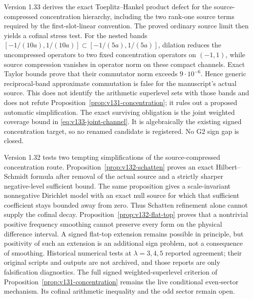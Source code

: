 \documentclass[11pt]{article}
\theoremstyle{remark}
\begin{document}
Version 1.33 derives the exact Toeplitz--Hankel product defect for the
source-compressed concentration hierarchy, including the two rank-one
source terms required by the first-slot-linear convention.  The proved
ordinary source limit then yields a cofinal stress test.  For the nested
bands $[-1/(10a),1/(10a)]\subset[-1/(5a),1/(5a)]$, dilation reduces the
uncompressed operators to two fixed concentration operators on
$(-1,1)$, while source compression vanishes in operator norm on these
compact channels.  Exact Taylor bounds prove that their commutator norm
exceeds $9\cdot10^{-6}$.  Hence generic reciprocal-band approximate
commutation is false for the manuscript's actual source.  This does not
identify the arithmetic superlevel sets with those bands and does not
refute Proposition~\ref{prop:v131-concentration}; it rules out a proposed
automatic simplification.  The exact surviving obligation is the joint
weighted coverage bound in \eqref{eq:v133-joint-channel}.  It is
algebraically the existing signed concentration target, so no renamed
candidate is registered.  No G2 sign gap is closed.

Version 1.32 tests two tempting simplifications of the source-compressed
concentration route.  Proposition~\ref{prop:v132-schatten} proves an
exact Hilbert--Schmidt formula after removal of the actual source and a
strictly sharper negative-level sufficient bound.  The same proposition
gives a scale-invariant nonnegative Dirichlet model with an exact null
source for which that sufficient coefficient stays bounded away from
zero.  Thus Schatten refinement alone cannot supply the cofinal decay.
Proposition~\ref{prop:v132-flat-top} proves that a nontrivial positive
frequency smoothing cannot preserve every form on the physical
difference interval.  A signed flat-top extension remains possible in
principle, but positivity of such an extension is an additional sign
problem, not a consequence of smoothing. Historical numerical tests
at $\lambda=3,4,5$ reported agreement; their original scripts and outputs
are not archived, and those reports are only falsification diagnostics.  The full signed weighted-superlevel
criterion of Proposition~\ref{prop:v131-concentration} remains the live
conditional even-sector mechanism.  Its cofinal arithmetic inequality
and the odd sector remain open.
\end{document}
